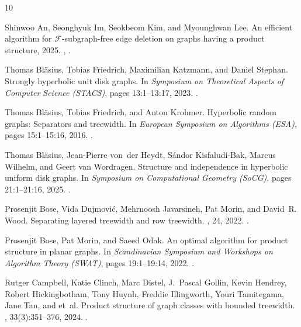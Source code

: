 \documentclass[11pt]{article}
\begin{document}
\begin{thebibliography}{10}

Shinwoo An, Seonghyuk Im, Seokbeom Kim, and Myounghwan Lee.
\newblock An efficient algorithm for $\mathcal{F}$-subgraph-free edge deletion on graphs having a product structure, 2025.
\newblock \href {https://arxiv.org/abs/2510.14674} {}, \href {https://doi.org/10.48550/arXiv.2510.14674} {}.

Thomas Bläsius, Tobias Friedrich, Maximilian Katzmann, and Daniel Stephan.
\newblock Strongly hyperbolic unit disk graphs.
\newblock In {\em Symposium on Theoretical Aspects of Computer Science (STACS)}, pages 13:1--13:17, 2023.
\newblock \href {https://doi.org/10.4230/LIPIcs.STACS.2023.13} {}.

Thomas Bläsius, Tobias Friedrich, and Anton Krohmer.
\newblock Hyperbolic random graphs: Separators and treewidth.
\newblock In {\em European Symposium on Algorithms (ESA)}, pages 15:1--15:16, 2016.
\newblock \href {https://doi.org/10.4230/LIPIcs.ESA.2016.15} {}.

Thomas Bläsius, Jean-Pierre von~der Heydt, S\'{a}ndor Kisfaludi-Bak, Marcus Wilhelm, and Geert van Wordragen.
\newblock Structure and independence in hyperbolic uniform disk graphs.
\newblock In {\em Symposium on Computational Geometry (SoCG)}, pages 21:1--21:16, 2025.
\newblock \href {https://doi.org/10.4230/LIPIcs.SoCG.2025.21} {}.

Prosenjit Bose, Vida Dujmović, Mehrnoosh Javarsineh, Pat Morin, and David~R. Wood.
\newblock Separating layered treewidth and row treewidth.
, 24, 2022.
\newblock \href {https://doi.org/10.46298/dmtcs.7458} {}.

Prosenjit Bose, Pat Morin, and Saeed Odak.
\newblock An optimal algorithm for product structure in planar graphs.
\newblock In {\em Scandinavian Symposium and Workshops on Algorithm Theory (SWAT)}, pages 19:1--19:14, 2022.
\newblock \href {https://doi.org/10.4230/LIPIcs.SWAT.2022.19} {}.

Rutger Campbell, Katie Clinch, Marc Distel, J.~Pascal Gollin, Kevin Hendrey, Robert Hickingbotham, Tony Huynh, Freddie Illingworth, Youri Tamitegama, Jane Tan, and et~al.
\newblock Product structure of graph classes with bounded treewidth.
, 33(3):351--376, 2024.
\newblock \href {https://doi.org/10.1017/S0963548323000457} {}.


\end{thebibliography}
\end{document}
